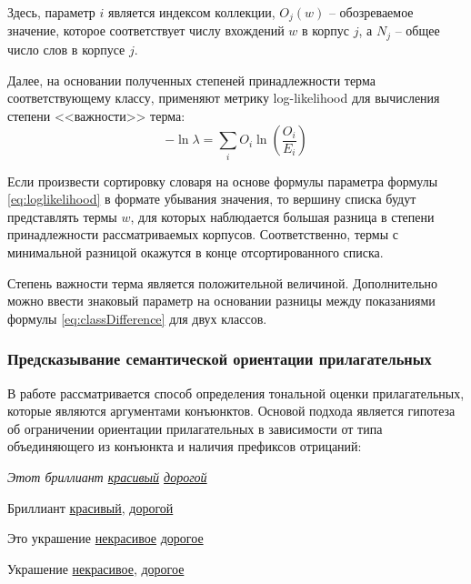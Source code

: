         Здесь, параметр $i$ является индексом коллекции, $O_j(w)$ -- обозреваемое
        значение, которое соответствует числу вхождений $w$ в корпус $j$, а $N_j$
        -- общее число слов в корпусе $j$.

        Далее, на основании полученных степеней принадлежности терма соответствующему
        классу, применяют метрику log-likelihood для вычисления степени <<важности>>
        терма:
        \begin{equation}
            \label{eq:loglikelihood}
            - \ln \lambda = \sum\limits_i O_i \ln \left( \dfrac{O_i}{E_i} \right)
        \end{equation}

        Если произвести сортировку словаря на основе формулы параметра формулы
        \ref{eq:loglikelihood} в формате убывания значения, то вершину списка
        будут представлять термы $w$, для которых наблюдается большая разница в
        степени принадлежности рассматриваемых корпусов. Соответственно, термы
        с минимальной разницой окажутся в конце отсортированного списка.

        Степень важности терма является положительной величиной. Дополнительно можно
        ввести знаковый параметр на основании разницы между показаниями формулы
        \ref{eq:classDifference} для двух классов.

        \subsubsection{Предсказывание семантической ориентации прилагательных}
        \label{sec:adjectivesPrediction}
        В работе \cite{lexiconAdjectives} рассматривается способ определения
        тональной оценки прилагательных, которые являются аргументами конъюнктов.
        Основой подхода является гипотеза об ограничении ориентации прилагательных
        в зависимости от типа объединяющего из конъюнкта и наличия префиксов отрицаний:
        \begin{center}
            \it
            Этот бриллиант \underline{красивый} {} \underline{дорогой}

            Бриллиант \underline{красивый}, {} \underline{дорогой}

            Это украшение \underline{некрасивое} {} \underline{дорогое}

            Украшение \underline{некрасивое}, {} \underline{дорогое}
        \end{center}

